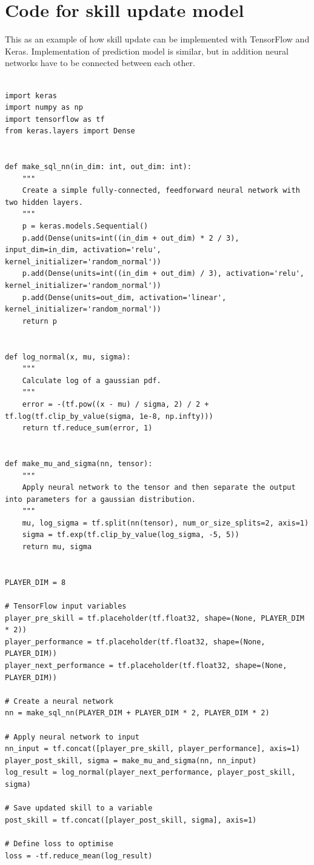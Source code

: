 \documentclass[12pt,a4paper]{book}
\begin{document}
\chapter{Code for skill update model} \label{code-example}
This as an example of how skill update can be implemented with TensorFlow and Keras.
Implementation of prediction model is similar, but in addition neural networks have to be connected between each other.

\begin{verbatim}

import keras
import numpy as np
import tensorflow as tf
from keras.layers import Dense


def make_sql_nn(in_dim: int, out_dim: int):
    """
    Create a simple fully-connected, feedforward neural network with two hidden layers.
    """
    p = keras.models.Sequential()
    p.add(Dense(units=int((in_dim + out_dim) * 2 / 3), input_dim=in_dim, activation='relu', kernel_initializer='random_normal'))
    p.add(Dense(units=int((in_dim + out_dim) / 3), activation='relu', kernel_initializer='random_normal'))
    p.add(Dense(units=out_dim, activation='linear', kernel_initializer='random_normal'))
    return p


def log_normal(x, mu, sigma):
    """
    Calculate log of a gaussian pdf.
    """
    error = -(tf.pow((x - mu) / sigma, 2) / 2 + tf.log(tf.clip_by_value(sigma, 1e-8, np.infty)))
    return tf.reduce_sum(error, 1)


def make_mu_and_sigma(nn, tensor):
    """
    Apply neural network to the tensor and then separate the output into parameters for a gaussian distribution.
    """
    mu, log_sigma = tf.split(nn(tensor), num_or_size_splits=2, axis=1)
    sigma = tf.exp(tf.clip_by_value(log_sigma, -5, 5))
    return mu, sigma


PLAYER_DIM = 8

# TensorFlow input variables
player_pre_skill = tf.placeholder(tf.float32, shape=(None, PLAYER_DIM * 2))
player_performance = tf.placeholder(tf.float32, shape=(None, PLAYER_DIM))
player_next_performance = tf.placeholder(tf.float32, shape=(None, PLAYER_DIM))

# Create a neural network
nn = make_sql_nn(PLAYER_DIM + PLAYER_DIM * 2, PLAYER_DIM * 2)

# Apply neural network to input
nn_input = tf.concat([player_pre_skill, player_performance], axis=1)
player_post_skill, sigma = make_mu_and_sigma(nn, nn_input)
log_result = log_normal(player_next_performance, player_post_skill, sigma)

# Save updated skill to a variable
post_skill = tf.concat([player_post_skill, sigma], axis=1)

# Define loss to optimise
loss = -tf.reduce_mean(log_result)
\end{verbatim}
\end{document}
